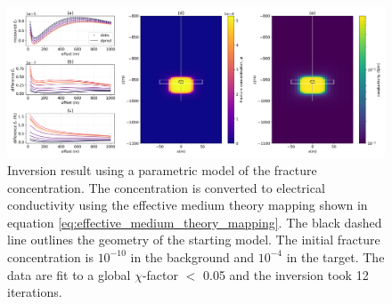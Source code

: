 \begin{figure}
    \begin{center}
    \includegraphics[width=\textwidth]{figures/inversion/dc_parametric_inversion_phi_correctz0.png}
    \end{center}
\caption{
    Inversion result using a parametric model of the fracture concentration. The concentration is
    converted to electrical conductivity using the effective medium theory mapping shown in
    equation \ref{eq:effective_medium_theory_mapping}.
    The black dashed line outlines the geometry of the starting model. The initial fracture concentration
    is $10^{-10}$ in the background and $10^{-4}$ in the target.
    The data are fit to a global $\chi$-factor $<$ 0.05 and the inversion took 12 iterations.
}
\label{fig:dc_parametric_inversion_phi_correctz0}
\end{figure}
